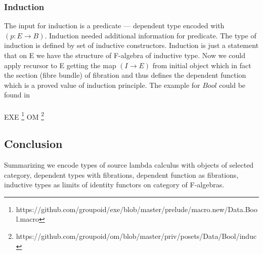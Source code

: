 \documentclass[11pt,oneside]{article}
\begin{document}
\subsubsection{Induction}
The input for induction is a predicate — dependent type encoded with $(p: E \rightarrow B)$.
Induction needed additional information for predicate. The type of induction is defined
by set of inductive constructors. Induction is just a statement that on E we have the
structure of F-algebra of inductive type. Now we could apply recursor to E
getting the map $(I \rightarrow E)$ from initial object which in fact the section (fibre bundle) of fibration
and thus defines the dependent function which is a proved value of induction principle.
The example for $Bool$ could be found in\\
\\
EXE \footnote{https://github.com/groupoid/exe/blob/master/prelude/macro.new/Data.Bool.macro}
OM \footnote{https://github.com/groupoid/om/blob/master/priv/posets/Data/Bool/induc}\\

\subsection{Conclusion}
Summarizing we encode types of source lambda calculus with objects of selected category,
dependent types with fibrations, dependent function as fibrations, inductive types as
limits of identity functors on category of F-algebras.
\end{document}
